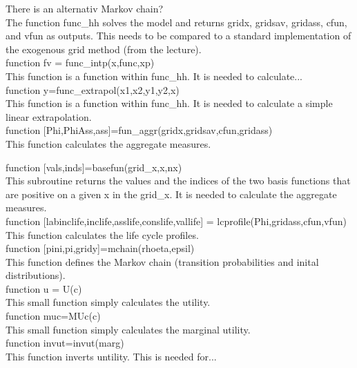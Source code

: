 \documentclass[12pt,a4paper]{article}
\begin{document}
There is an alternativ Markov chain? \\

The function func\_hh solves the model and returns gridx, gridsav, gridass, cfun, and vfun as outputs. This needs to be compared to a standard implementation of the exogenous grid method (from the lecture). \\

function fv = func\_intp(x,func,xp) \\
This function is a function within func\_hh. It is needed to calculate... \\

function y=func\_extrapol(x1,x2,y1,y2,x)\\
This function is a function within func\_hh. It is needed to calculate a simple linear extrapolation. \\


function [Phi,PhiAss,ass]=fun\_aggr(gridx,gridsav,cfun,gridass)\\
This function calculates the aggregate measures.

function [vals,inds]=basefun(grid\_x,x,nx)\\
This subroutine returns the values and the indices of the two basis functions that are positive on a given x in the grid\_x. It is needed to calculate the aggregate measures. \\
        
function [labinclife,inclife,asslife,conslife,vallife] = lcprofile(Phi,gridass,cfun,vfun)\\
This function calculates the life cycle profiles.\\

function [pini,pi,gridy]=mchain(rhoeta,epsil)\\
This function defines the Markov chain (transition probabilities and inital distributions). \\

function u = U(c)\\
This small function simply calculates the utility. \\

function muc=MUc(c)\\
This small function simply calculates the marginal utility. \\

function invut=invut(marg)\\
This function inverts untility. This is needed for...\\
\end{document}
